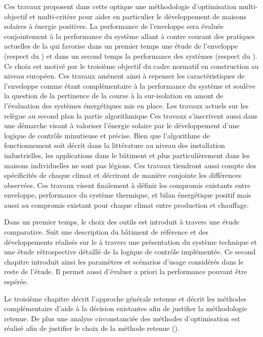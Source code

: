 Ces travaux proposent dans cette optique une méthodologie d’optimisation
multi-objectif et multi-critère pour aider en particulier le développement de
maisons solaires à énergie positives. La performance de l’enveloppe sera évaluée
conjointement à la performance du système allant à contre courant des pratiques
actuelles de la  qui favorise dans un premier temps une étude de l’enveloppe
(respect du ) et dans un second temps la performance des systèmes
(respect du ). Ce choix est motivé par le troisième objectif du cadre
normatif en construction au niveau européen. Ces travaux amènent ainsi à repenser
les caractéristiques de l’enveloppe comme étant complémentaire à la performance du système
et soulève la question de la pertinence de la course à la sur-isolation en amont
de l’évaluation des systèmes énergétiques mis en place.
Les travaux actuels sur les  relègue au second plan la partie algorithmique
Ces travaux s’inscrivent aussi dans une démarche visant à valoriser l’énergie solaire
par le développement d’une logique de contrôle minutieuse et précise. Bien que
l’algorithme de fonctionnement soit décrit dans la littérature au niveau des installation
industrielles, les applications dans le bâtiment et plus particulièrement dans les
maisons individuelles ne sont pas légions. Ces travaux tiendront aussi compte
des spécificités de chaque climat et décriront de manière conjointe les différences
observées. Ces travaux visent finalement à définir les compromis existants entre
enveloppe, performance du système thermique, et bilan énergétique positif mais aussi
au compromis existant pour chaque climat entre production  et chauffage.

Dans un premier temps, le choix des outils est introduit à travers une étude comparative.
Suit une description du bâtiment de référence et des développements réalisés sur le
 à travers une présentation du système technique et une étude rétrospective
détaillé de la logique de contrôle implémentée.
Ce second chapitre introduit ainsi les paramètres et scénarios d’usage considérés dans le reste de l’étude. Il
permet aussi d’évaluer a priori la performance pouvant être espérée.

Le troisième chapitre décrit l’approche générale retenue et décrit les méthodes complémentaire
d’aide à la décision existantes afin de justifier la méthodologie retenue. De plus
une analyse circonstanciée des méthodes d’optimisation est réalisé afin de justifier
le choix de la méthode retenue ().

